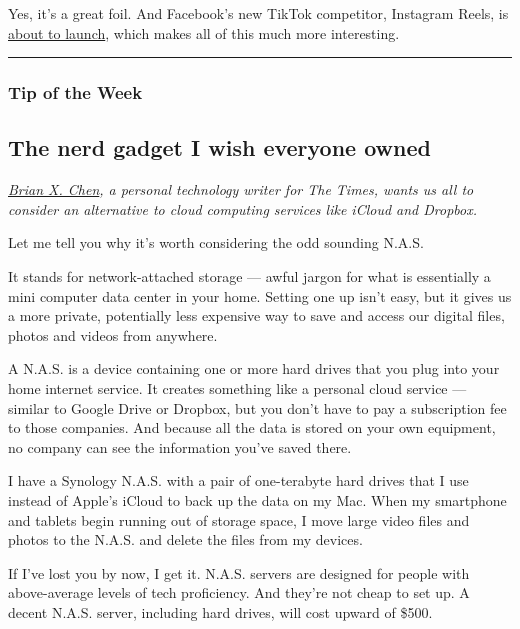 Yes, it's a great foil. And Facebook's new TikTok competitor, Instagram
Reels, is
\href{https://www.usatoday.com/story/tech/2020/07/19/facebook-tiktok-competitor-instagram-reels-launch/5467934002/}{about
to launch}, which makes all of this much more interesting.

\begin{center}\rule{0.5\linewidth}{\linethickness}\end{center}

\hypertarget{tip-of-the-week}{%
\subsubsection{Tip of the Week}\label{tip-of-the-week}}

\hypertarget{the-nerd-gadget-i-wish-everyone-owned}{%
\subsection{The nerd gadget I wish everyone
owned}\label{the-nerd-gadget-i-wish-everyone-owned}}

\href{https://www.nytimes3xbfgragh.onion/by/brian-x-chen}{\emph{Brian X.
Chen}}\emph{, a personal technology writer for The Times, wants us all
to consider an alternative to cloud computing services like iCloud and
Dropbox.}

Let me tell you why it's worth considering the odd sounding N.A.S.

It stands for network-attached storage --- awful jargon for what is
essentially a mini computer data center in your home. Setting one up
isn't easy, but it gives us a more private, potentially less expensive
way to save and access our digital files, photos and videos from
anywhere.

A N.A.S. is a device containing one or more hard drives that you plug
into your home internet service. It creates something like a personal
cloud service --- similar to Google Drive or Dropbox, but you don't have
to pay a subscription fee to those companies. And because all the data
is stored on your own equipment, no company can see the information
you've saved there.

I have a Synology N.A.S. with a pair of one-terabyte hard drives that I
use instead of Apple's iCloud to back up the data on my Mac. When my
smartphone and tablets begin running out of storage space, I move large
video files and photos to the N.A.S. and delete the files from my
devices.

If I've lost you by now, I get it. N.A.S. servers are designed for
people with above-average levels of tech proficiency. And they're not
cheap to set up. A decent N.A.S. server, including hard drives, will
cost upward of \$500.

